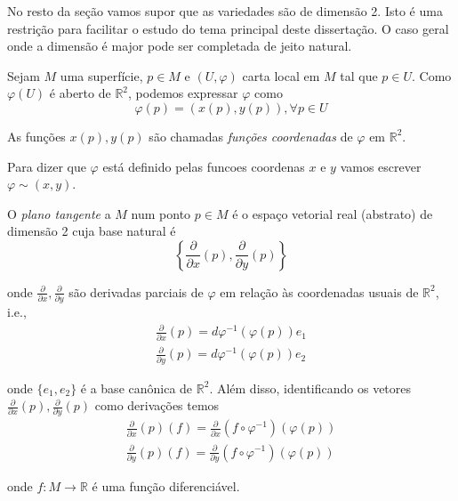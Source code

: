 No resto da seção vamos supor que as variedades são de dimensão 2. Isto é uma restrição para facilitar o estudo do tema principal deste dissertação. O caso geral onde a dimensão é major pode ser completada de jeito natural.

Sejam $M$ uma superfície, $p \in M$ e $(U, \varphi)$ carta local em $M$ tal que $p \in U$. Como $\varphi(U)$ é aberto de $\mathbb{R}^2$, podemos expressar $\varphi$ como
\begin{equation*}
	\varphi(p) = (x(p), y(p)), \forall p \in U
\end{equation*}

As funções $x(p), y(p)$ são chamadas \emph{funções coordenadas} de $\varphi$ em $\mathbb{R}^2$.

\begin{nota}
	Para dizer que $\varphi$ está definido pelas funcoes coordenas $x$ e $y$ vamos escrever $\varphi \sim  (x,y)$.
\end{nota}

\begin{defi}
	O \emph{plano tangente} a $M$ num ponto $p \in M$ é o espaço vetorial real (abstrato) de dimensão 2 cuja base natural é
	\begin{equation*}
		\left\{ \frac{\partial}{\partial x} (p), \frac{\partial}{\partial y} (p) \right\}
	\end{equation*}
	
	onde $\frac{\partial}{\partial x}, \frac{\partial}{\partial y}$ são derivadas parciais de $\varphi$ em relação às coordenadas usuais de $\mathbb{R}^2$, i.e.,
	\begin{align*}
		\frac{\partial}{\partial x} (p) = d \varphi^{-1} ( \varphi(p) ) e_1\\
		\frac{\partial}{\partial y} (p) = d \varphi^{-1} ( \varphi(p) ) e_2
	\end{align*}
	
	onde $\{ e_1,e_2 \}$ é a base canônica de $\mathbb{R}^2$. Além disso, identificando os vetores $\frac{\partial}{\partial x} (p), \frac{\partial}{\partial y} (p)$ como derivações temos
	\begin{align*}
		\frac{\partial}{\partial x} (p) (f) = \frac{\partial}{\partial x} \left( f \circ \varphi^{-1} \right) (\varphi(p))\\
		\frac{\partial}{\partial y} (p) (f) = \frac{\partial}{\partial y} \left( f \circ \varphi^{-1} \right) (\varphi(p))
	\end{align*}
	
	onde $f: M \rightarrow \mathbb{R}$ é uma função diferenciável.
\end{defi}

